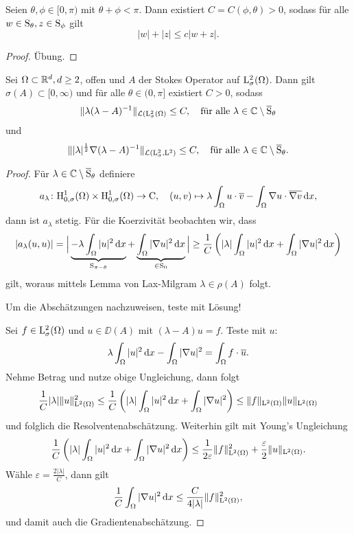 \begin{lem}
  Seien $\theta, \phi \in [0,\pi)$ mit $\theta + \phi < \pi$.
    Dann existiert $C = C(\phi,\theta) > 0$, sodass für alle $w \in \mathrm{S}_\theta, z \in \mathrm{S}_\phi$ gilt
    $$
    |w| + |z| \leq c |w + z|.
    $$
\end{lem}

\begin{proof}
  Übung.
\end{proof}

\begin{prop}
  Sei $\Omega \subset \mathbb{R}^d, d\geq2$, offen und $A$ der Stokes Operator auf $\mathrm{L}^2_\sigma(\Omega)$. Dann gilt $\sigma(A) \subset [0,\infty)$ und für alle $\theta \in (0,\pi]$ existiert $C > 0$, sodass
  $$
  \| \lambda (\lambda - A)^{-1}\|_{\mathcal{L}(\mathrm{L}^2_\sigma(\Omega)} \leq C, \quad\text{für alle } \lambda \in \mathbb{C} \setminus \overline {\mathrm{S}}_\theta
  $$
  und
  $$
  \| |\lambda|^{\frac{1}{2}} \nabla (\lambda - A)^{-1} \|_{\mathcal{L}(\mathrm{L}_\sigma^2, \mathrm{L}^2)} \leq C, \quad\text{für alle } \lambda \in \mathbb{C} \setminus \overline {\mathrm{S}}_\theta.
  $$
\end{prop}

\begin{proof}
  Für $\lambda \in \mathbb{C} \setminus \overline {\mathrm{S}}_\theta$ definiere
  $$
  a_\lambda \colon \mathrm{H}_{0,\sigma}^1(\Omega) \times \mathrm{H}_{0,\sigma}^1(\Omega) \to \mathrm{C}, \quad (u,v) \mapsto \lambda \int_\Omega u \cdot \overline v - \int_\Omega \nabla u \cdot \overline{\nabla v} \, {\operatorname{d}\!{x}},
  $$
  dann ist $a_\lambda$ stetig.
  Für die Koerzivität beobachten wir, dass
  $$
  |a_\lambda(u,u)| 
  = \Big| \underbrace{- \lambda\int_\Omega |u|^2 \, {\operatorname{d}\!{x}}}_{\mathrm{S}_{\pi - \theta}} + \underbrace{\int_\Omega |\nabla u|^2 \, {\operatorname{d}\!{x}}}_{\in \mathrm{S}_0} \Big| 
  \geq \frac{1}{C} \left( |\lambda| \int_\Omega |u|^2 \, {\operatorname{d}\!{x}} + \int_\Omega |\nabla u|^2 \, {\operatorname{d}\!{x}}\right)
  $$
  gilt, woraus mittels Lemma von Lax-Milgram $\lambda \in \rho(A)$ folgt.
  
  Um die Abschätzungen nachzuweisen, teste mit Lösung!

  Sei $f \in \mathrm{L}_\sigma^2(\Omega)$ und $u \in \DD(A)$ mit $(\lambda - A) u = f$.
  Teste mit $u$:
  $$
  \lambda \int_\Omega |u|^2 \, {\operatorname{d}\!{x}} - \int_\Omega |\nabla u|^2 = \int_\Omega f \cdot \overline u.
  $$
  Nehme Betrag und nutze obige Ungleichung, dann folgt
  $$
  \frac{1}{C} |\lambda|\|u\|_{\mathrm{L}^2(\Omega)}^2 
  \leq \frac{1}{C} \left(|\lambda| \int_\Omega |u|^2 \, {\operatorname{d}\!{x}} + \int_\Omega |\nabla u|^2\right) 
  \leq \|f\|_{\mathrm{L}^2(\Omega)} \|u\|_{\mathrm{L}^2(\Omega)}
  $$
  und folglich die Resolventenabschätzung.
  Weiterhin gilt mit Young's Ungleichung
  $$
  \frac{1}{C} \left(|\lambda| \int_\Omega |u|^2 \, {\operatorname{d}\!{x}} + \int_\Omega |\nabla u|^2 \, {\operatorname{d}\!{x}} \right)
  \leq \frac{1}{2\varepsilon} \|f\|_{\mathrm{L}^2(\Omega)}^2 + \frac{\varepsilon}{2} \|u\|_{\mathrm{L}^2(\Omega)}.
  $$
  Wähle $\varepsilon = \frac{2|\lambda|}{C}$, dann gilt
  $$
  \frac{1}{C} \int_\Omega |\nabla u|^2 \, {\operatorname{d}\!{x}} \leq \frac{C}{4|\lambda|} \|f \|_{\mathrm{L}^2(\Omega)}^2,
  $$
  und damit auch die Gradientenabschätzung.
\end{proof}


